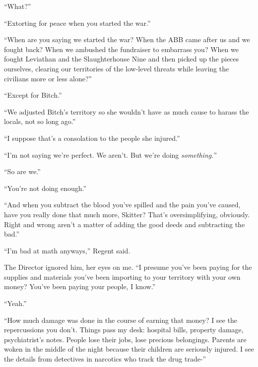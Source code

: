 ``What?''



``Extorting for peace when you started the war.''



``When are you saying we started the war?  When the ABB came after us and we fought back?  When we ambushed the fundraiser to embarrass you?  When we fought Leviathan and the Slaughterhouse Nine and then picked up the pieces ourselves, clearing our territories of the low-level threats while leaving the civilians more or less alone?''



``Except for Bitch.''



``We adjusted Bitch's territory so she wouldn't have as much cause to harass the locals, not so long ago.''



``I suppose that's a consolation to the people she injured.''



``I'm not saying we're perfect.  We aren't.  But we're doing \emph{something.}''



``So are we.''



``You're not doing enough.''



``And when you subtract the blood you've spilled and the pain you've caused, have you really done that much more, Skitter?  That's oversimplifying, obviously.  Right and wrong aren't a matter of adding the good deeds and subtracting the bad.''



``I'm bad at math anyways,'' Regent said.



The Director ignored him, her eyes on me.  ``I presume you've been paying for the supplies and materials you've been importing to your territory with your own money?  You've been paying your people, I know.''



``Yeah.''



``How much damage was done in the course of earning that money?  I see the repercussions you don't.  Things pass my desk: hospital bills, property damage, psychiatrist's notes.  People lose their jobs, lose precious belongings.  Parents are woken in the middle of the night because their children are seriously injured.   I see the details from detectives in narcotics who track the drug trade-''



